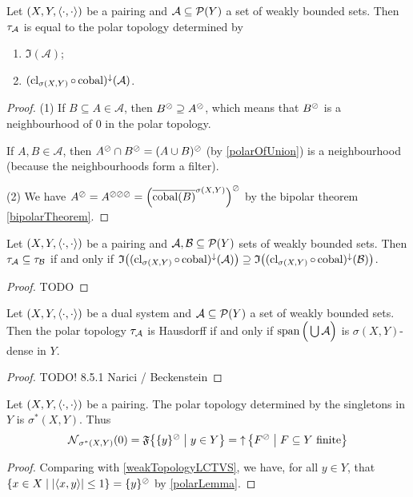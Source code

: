 \begin{lemma} \label{setsDeterminingTheSamePolarTopologies}
Let $\sSet{X,Y,\pair{\cdot,\cdot}}$ be a pairing and $\mathcal{A}\subseteq\operatorname{\mathcal{P}}(Y)$ a set of weakly bounded sets. Then $\tau_{\mathcal{A}}$ is equal to the polar topology determined by
\begin{enumerate}
\item $\mathfrak{I}(\mathcal{A})$;
\item $(\operatorname{cl}_{\sigma(X,Y)}\circ \operatorname{cobal})^{\downarrow}(\mathcal{A})$.
\end{enumerate}
\end{lemma}
\begin{proof}
(1) If $B\subseteq A\in \mathcal{A}$, then $B^\oslash \supseteq A^\oslash$, which means that $B^\oslash$ is a neighbourhood of $0$ in the polar topology.

If $A,B\in \mathcal{A}$, then $A^\oslash\cap B^\oslash = (A\cup B)^\oslash$ (by \ref{polarOfUnion}) is a neighbourhood (because the neighbourhoods form a filter).

(2) We have $A^\oslash = A^{\oslash\oslash\oslash} = \Big(\overline{\operatorname{cobal}(B)}^{\sigma(X,Y)}\Big)^\oslash$ by the bipolar theorem \ref{bipolarTheorem}.
\end{proof}

\begin{lemma} \label{polarTopologyOrdering}
Let $\sSet{X,Y,\pair{\cdot,\cdot}}$ be a pairing and $\mathcal{A}, \mathcal{B}\subseteq\operatorname{\mathcal{P}}(Y)$ sets of weakly bounded sets. Then $\tau_{\mathcal{A}} \subseteq \tau_{\mathcal{B}}$ \textup{if and only if} $\mathfrak{I}\big((\operatorname{cl}_{\sigma(X,Y)}\circ \operatorname{cobal})^{\downarrow}(\mathcal{A})\big) \supseteq \mathfrak{I}\big((\operatorname{cl}_{\sigma(X,Y)}\circ \operatorname{cobal})^{\downarrow}(\mathcal{B})\big)$.
\end{lemma}
\begin{proof}
TODO
\end{proof}

\begin{proposition}
Let $\sSet{X,Y,\pair{\cdot,\cdot}}$ be a dual system and  $\mathcal{A}\subseteq\operatorname{\mathcal{P}}(Y)$ a set of weakly bounded sets. Then the polar topology $\tau_{\mathcal{A}}$ is Hausdorff \textup{if and only if} $\operatorname{span}\Big(\bigcup \mathcal{A}\Big)$ is $\sigma(X,Y)$-dense in $Y$.
\end{proposition}
\begin{proof}
TODO! 8.5.1 Narici / Beckenstein
\end{proof}

\begin{proposition} \label{weak*topologyPolarTopology}
Let $\sSet{X,Y,\pair{\cdot,\cdot}}$ be a pairing. The polar topology determined by the singletons in $Y$ is $\sigma^*(X,Y)$. Thus
\[ \neighbourhood_{\sigma^*(X,Y)}(0) = \mathfrak{F}\setbuilder{\{y\}^\pol}{y\in Y} = \upset\setbuilder{F^\pol}{\text{$F\subseteq Y$ finite}} \]
\end{proposition}
\begin{proof}
Comparing with \ref{weakTopologyLCTVS}, we have, for all $y\in Y$, that $\setbuilder{x\in X}{\abspair{x,y}\leq 1} = \{y\}^\pol$ by \ref{polarLemma}.
\end{proof}


